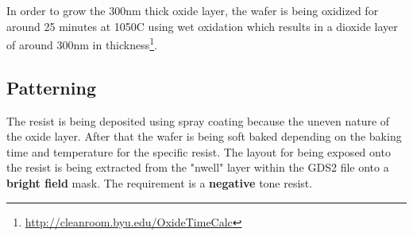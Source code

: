 In order to grow the 300nm thick oxide layer, the wafer is being oxidized for around 25 minutes at 1050\degree C using wet oxidation which results in a dioxide layer of around 300nm in thickness\footnote{\url{http://cleanroom.byu.edu/OxideTimeCalc}}.

\subsection{Patterning}

The resist is being deposited using spray coating because the uneven nature of the oxide layer.
After that the wafer is being soft baked depending on the baking time and temperature for the specific resist.
The layout for being exposed onto the resist is being extracted from the "nwell" layer within the GDS2 file onto a \textbf{bright field} mask.
The requirement is a \textbf{negative} tone resist.

